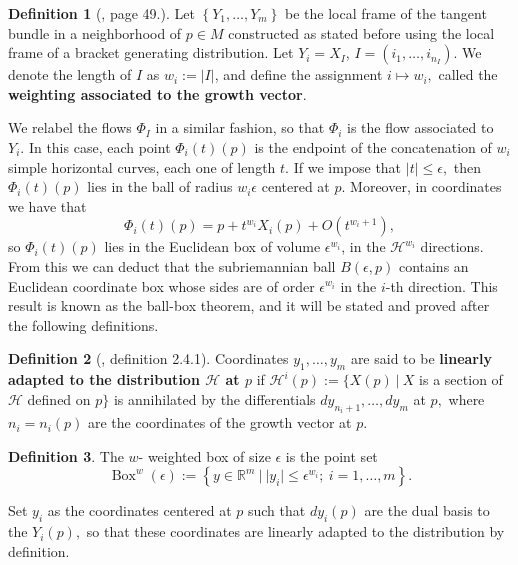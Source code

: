 \documentclass[12pt, letterpaper, reqno]{amsart}
\theoremstyle{definition}
\newtheorem{df}{Definition}
\theoremstyle{plain}
\theoremstyle{remark}
\begin{document}
\begin{df}[\cite{montgomery2002tour}, page 49.] Let $ \left\{ Y_1,\dots, Y_m \right\} $ be the local frame of the tangent bundle in a neighborhood of $ p\in M $ constructed as stated before using the local frame of a bracket generating distribution. Let $ Y_i=X_I $, $ I=(i_1,\dots,i_{n_I}) $. We denote the length of $ I $ as $ w_i:= \left| I \right| $, and define the assignment $ i\mapsto w_i, $ called the \textbf{weighting associated to the growth vector}. 
	
\end{df}

We relabel the flows $ \Phi_I $ in a similar fashion, so that $ \Phi_i $ is the flow associated to $ Y_i. $ In this case, each point $ \Phi_i(t)(p) $ is the endpoint of the concatenation of $ w_i $ simple horizontal curves, each one of length $ t $. If we impose that $ \left| t \right|\leq \epsilon, $ then $ \Phi_i(t)(p) $ lies in the ball of radius $ w_i\epsilon $ centered at $ p. $ Moreover, in coordinates we have that 
$$ \Phi_i(t)(p)=p+t^{w_i}X_i(p)+ O(t^{w_i+1}), $$ 
so $ \Phi_i(t)(p) $ lies in the Euclidean box of volume $ \epsilon^{w_i} $, in the $ \mathcal{H}^{w_i} $ directions. From this we can deduct that the subriemannian ball $ B(\epsilon,p) $ contains an Euclidean coordinate box whose sides are of order $ \epsilon^{w_i} $ in the $ i $-th direction. This result is known as the ball-box theorem, and it will be stated and proved after the following definitions.

\begin{df}[\cite{montgomery2002tour}, definition 2.4.1] 
	Coordinates $ y_1,\dots,y_m $ are said to be \textbf{linearly adapted to the distribution $\mathcal{H}$ at $ p $ } if $ \mathcal{H}^i(p):= \{ X(p) \ | \ X$ is a section of $\mathcal{H}$ defined on $p$$\}$ is annihilated by the differentials $ dy_{n_i+1},\dots, dy_m $ at $ p, $ where $ n_i=n_i(p) $ are the coordinates of the growth vector at $ p. $  
\end{df}
\begin{df}
	The $ w $- weighted box of size $ \epsilon $ is the point set
	$$ \operatorname{Box}^w(\epsilon) := \left\{ y\in \mathbb{R}^m \ | \ |y_i|\leq \epsilon^{w_i}; \ i=1,\dots,m \right\}.  $$ 
\end{df}

Set $ y_i $ as the coordinates centered at $ p $ such that $ dy_i(p) $ are the dual basis to the $ Y_i(p), $ so that these coordinates are linearly adapted to the distribution by definition.
\end{document}
